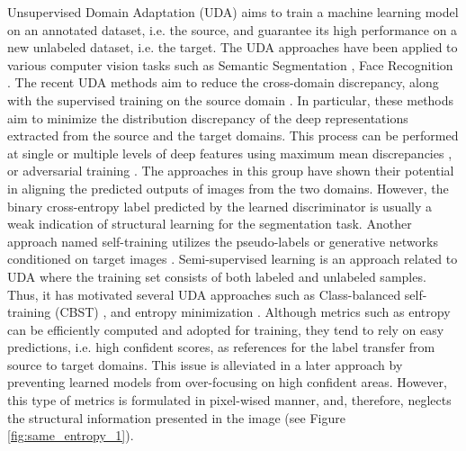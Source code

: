 \documentclass[10pt,twocolumn,letterpaper]{article}
\begin{document}
Unsupervised Domain Adaptation (UDA) aims to train a machine learning model on an annotated dataset, i.e. the source, and guarantee its high performance on a new unlabeled dataset, i.e. the target.
The UDA approaches have been applied to various computer vision tasks such as Semantic Segmentation \cite{chen2018deeplab, le2018segmentation, li2020content, vu2019advent, vu2019dada, zhang2019category}, Face Recognition \cite{duong2019shrinkteanet, Luu_BTAS2009, Luu_FG2011, Luu_ROBUST2008, Luu_IJCB2011}. 
The recent UDA methods aim to reduce the cross-domain discrepancy, along with the supervised training on the source domain \cite{chen2018road, ganin2015unsupervised, long2015learning,pan2020unsupervised, tzeng2017adversarial, vu2019advent}.
In particular, these methods aim to minimize the distribution discrepancy of the 
deep representations extracted from the source and the target domains. This process can be performed at single or multiple levels of deep features using maximum mean discrepancies \cite{ganin2015unsupervised, long2015learning, tzeng2017adversarial}, or adversarial training \cite{chen2018road, chen2017no, hoffman18a, hoffman2016fcns, hong2018CVPR, tsai2018learning}. The approaches in this group have shown their potential in aligning the predicted outputs of images from the two domains. However, 
the binary cross-entropy 
label predicted by the learned discriminator is usually a weak indication of structural learning for the segmentation task. Another approach named self-training utilizes the pseudo-labels or generative networks conditioned on target images \cite{murez2018CVPR, zhu2017unpaired}. Semi-supervised learning is an approach related to UDA where the training set consists of both labeled and unlabeled samples. Thus, it has motivated several UDA approaches such as Class-balanced self-training (CBST) \cite{zou2018unsupervised},  and entropy minimization \cite{chen2019domain, grandvalet2005semi, pan2020unsupervised, springenberg2015unsupervised, vu2019advent}.
Although metrics such as entropy can be efficiently computed and adopted for training, they tend to rely on easy predictions, i.e. high confident scores, as references for the label transfer from source to target domains. This issue is alleviated in a later approach \cite{chen2019domain} by preventing learned models from over-focusing on high confident areas. However, this type of metrics is formulated in pixel-wised manner, and, therefore, neglects the structural information presented in the image (see Figure \ref{fig:same_entropy_1}). 
\end{document}
